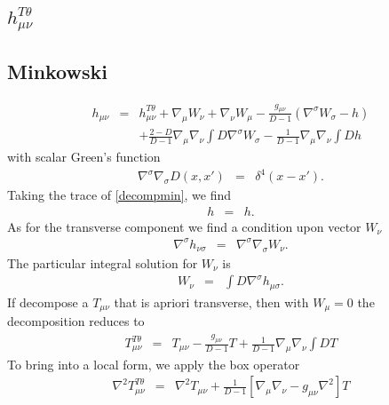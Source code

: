 \documentclass[10pt,letterpaper]{article}
\numberwithin{equation}{section}
\begin{document}
\newpage
\begin{appendices}
%
%
%
\section{$h_{\mu\nu}^{T\theta}$}

\subsection{Minkowski}
\begin{eqnarray}
h_{\mu\nu} &=& h_{\mu\nu}^{T\theta} + \nabla_\mu W_\nu + \nabla_\nu W_\mu - \frac{g_{\mu\nu}}{D-1}(\nabla^\sigma W_\sigma - h)
\nonumber\\
&& +\frac{2-D}{D-1} \nabla_\mu\nabla_\nu  \int D \nabla^\sigma W_\sigma
-\frac{1}{D-1}\nabla_\mu\nabla_\nu  \int D h
\label{decompmin}
\end{eqnarray}
with scalar Green's function
\begin{eqnarray}
 \nabla^\sigma \nabla_\sigma D(x,x') &=& \delta^4(x-x').
\end{eqnarray}
Taking the trace of \eqref{decompmin}, we find
\begin{eqnarray}
h &=& h.
\end{eqnarray}
As for the transverse component we find  a condition upon vector $W_\nu$
\begin{eqnarray}
\nabla^\sigma h_{\nu\sigma}&=& \nabla^\sigma\nabla_\sigma W_\nu.
\end{eqnarray}
The particular integral solution for $W_\nu$ is
\begin{eqnarray}
W_\nu &=& \int D \nabla^\sigma h_{\mu\sigma}.
\end{eqnarray}
If decompose a $T_{\mu\nu}$ that is apriori transverse, then with $W_\mu =0$ the decomposition reduces to
\begin{eqnarray}
T^{T\theta}_{\mu\nu} &=& T_{\mu\nu} - \frac{g_{\mu\nu}}{D-1}T + \frac{1}{D-1}\nabla_\mu\nabla_\nu \int D T
\label{consmin}
\end{eqnarray}
To bring into a local form, we apply the box operator
\begin{eqnarray}
\nabla^2 T^{T\theta}_{\mu\nu} &=& \nabla^2 T_{\mu\nu} + \frac{1}{D-1}\left[ 
\nabla_\mu\nabla_\nu - g_{\mu\nu}\nabla^2\right]T
\label{boxconsmin}
\end{eqnarray}
%
%
%



\end{appendices}
\end{document}
